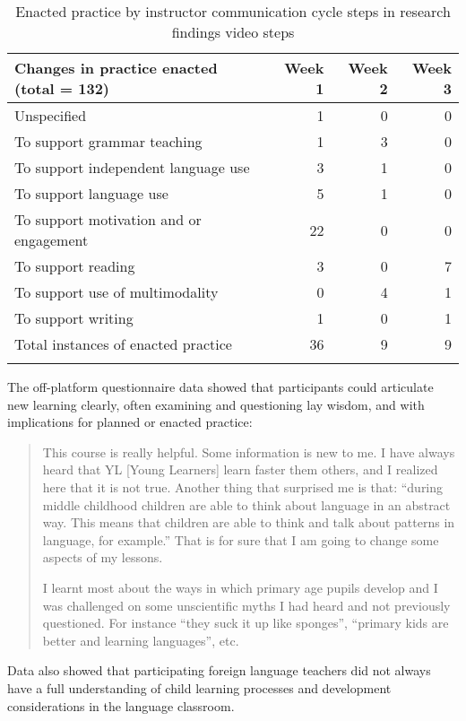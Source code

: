\documentclass[output=paper]{langscibook}
\begin{document}
\begin{table}
\begin{tabularx}{\textwidth}{Qrrr}
\lsptoprule
{Changes in practice enacted (total = 132)} & {Week 1} & {Week 2} & {Week 3}\\
\midrule
Unspecified & 1 & 0 & 0\\
{To support grammar teaching} & 1 & 3 & 0\\
{To support independent language use} & 3 & 1 & 0\\
{To support language use} & 5 & 1 & 0\\
{To support motivation and or engagement} & 22 & 0 & 0\\
{To support reading} & 3 & 0 & 7\\
{To support use of multimodality} & 0 & 4 & 1\\
{To support writing} & 1 & 0 & 1\\
\midrule
{Total instances of enacted practice} & 36 & 9 & 9\\
\lspbottomrule
\end{tabularx}
\caption{Enacted practice by instructor communication cycle steps in research findings video steps}
\label{tab:porter:8}
\end{table}

The off-platform questionnaire data showed that participants could articulate new learning clearly, often examining and questioning lay wisdom, and with implications for planned or enacted practice:

\begin{quote}
This course is really helpful. Some information is new to me. I have always heard that YL [Young Learners] learn faster them others, and I realized here that it is not true. Another thing that surprised me is that: ``during middle childhood children are able to think about language in an abstract way. This means that children are able to think and talk about patterns in language, for example.'' That is for sure that I am going to change some aspects of my lessons.

I learnt most about the ways in which primary age pupils develop and I was challenged on some unscientific myths I had heard and not previously questioned. For instance ``they suck it up like sponges'', ``primary kids are better and learning languages'', etc.
\end{quote}

Data also showed that participating foreign language teachers did not always have a full understanding of child learning processes and development considerations in the language classroom.
\end{document}
